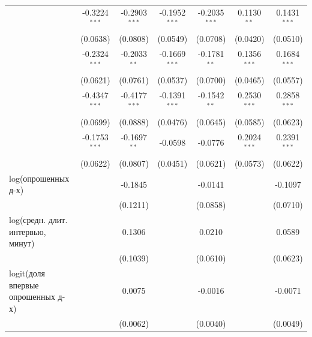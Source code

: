 \begin{tabular}{lcccccc}
   \qquad 2019                    & -0.3224$^{***}$       & -0.2903$^{***}$ & -0.1952$^{***}$       & -0.2035$^{***}$ & 0.1130$^{**}$  & 0.1431$^{***}$\\   
                                    & (0.0638)              & (0.0808)        & (0.0549)              & (0.0708)        & (0.0420)       & (0.0510)\\   
   \qquad 2020                    & -0.2324$^{***}$       & -0.2033$^{**}$  & -0.1669$^{***}$       & -0.1781$^{**}$  & 0.1356$^{***}$ & 0.1684$^{***}$\\   
                                    & (0.0621)              & (0.0761)        & (0.0537)              & (0.0700)        & (0.0465)       & (0.0557)\\   
   \qquad 2021                    & -0.4347$^{***}$       & -0.4177$^{***}$ & -0.1391$^{***}$       & -0.1542$^{**}$  & 0.2530$^{***}$ & 0.2858$^{***}$\\   
                                    & (0.0699)              & (0.0888)        & (0.0476)              & (0.0645)        & (0.0585)       & (0.0623)\\   
   \qquad 2022                    & -0.1753$^{***}$       & -0.1697$^{**}$  & -0.0598               & -0.0776         & 0.2024$^{***}$ & 0.2391$^{***}$\\   
                                    & (0.0622)              & (0.0807)        & (0.0451)              & (0.0621)        & (0.0573)       & (0.0622)\\   
   log(опрошенных д-х)                  &                       & -0.1845         &                       & -0.0141         &                & -0.1097\\   
                                    &                       & (0.1211)        &                       & (0.0858)        &                & (0.0710)\\   
   log(средн. длит. интервью, минут)         &                       & 0.1306          &                       & 0.0210          &                & 0.0589\\   
                                    &                       & (0.1039)        &                       & (0.0610)        &                & (0.0623)\\   
   logit(доля впервые опрошенных д-х)    &                       & 0.0075          &                       & -0.0016         &                & -0.0071\\   
                                    &                       & (0.0062)        &                       & (0.0040)        &                & (0.0049)\\   

\end{tabular}
